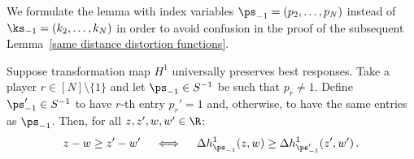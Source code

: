 We formulate the lemma with index variables $\ps_{-1} = (p_2, \ldots, p_N)$ instead of $\ks_{-1} = (k_2,\ldots,k_N)$ in order to avoid confusion in the proof of the subsequent Lemma~\ref{same distance distortion functions}.
\begin{lemma}
\label{app:relating distance maps}
Suppose transformation map $H^1$ universally preserves best responses. Take a player $r \in [N] \setminus \{1\}$ and let $\ps_{-1} \in S^{-1}$ be such that $p_r \neq 1$. Define $\ps_{-1}' \in S^{-1}$ to have $r$-th entry $p_r' = 1$ and, otherwise, to have the same entries as $\ps_{-1}$. Then, for all $z,z',w,w' \in \R$:
\begin{align*}
z-w \geq z'-w' \quad \iff \quad \Delta h_{\ps_{-1}}^1(z,w) \geq \Delta h_{\ps_{-1}'}^1(z',w') \, .
\end{align*}
\end{lemma}

